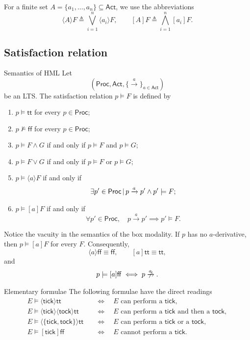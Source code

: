 \documentclass[a4paper]{article}
\newcommand{\Proc}{\mathsf{Proc}}
\newcommand{\Act}{\mathsf{Act}}
\newcommand{\ttt}{\mathsf{tt}}
\newcommand{\fff}{\mathsf{ff}}
\newcommand{\trans}[1]{\xrightarrow{#1}}
\newcommand{\nottrans}[1]{\centernot{\xrightarrow{#1}}}
\begin{document}
For a finite set \(A=\{a_1,\ldots,a_n\}\subseteq\Act\), we use the abbreviations
\[
    \langle A\rangle F
    \triangleq
    \bigvee_{i=1}^n \langle a_i\rangle F,
    \qquad
    [A]F
    \triangleq
    \bigwedge_{i=1}^n [a_i]F.
\]

\subsection{Satisfaction relation}

\begin{snippetdefinition}{Semantics of HML}
    Let
    \[
        (\Proc,\Act,\{\trans{a}\}_{a\in\Act})
    \]
    be an LTS. The satisfaction relation \(p\models F\) is defined by
    \begin{enumerate}
        \item \(p\models\ttt\) for every \(p\in\Proc\);
        \item \(p\not\models\fff\) for every \(p\in\Proc\);
        \item \(p\models F\land G\) if and only if \(p\models F\) and \(p\models G\);
        \item \(p\models F\lor G\) if and only if \(p\models F\) or \(p\models G\);
        \item \(p\models\langle a\rangle F\) if and only if
            \[
                \exists p'\in\Proc\suchthat
                p\trans{a}p'\land p'\models F;
            \]
        \item \(p\models[a]F\) if and only if
            \[
                \forall p'\in\Proc,
                \quad p\trans{a}p'\implies p'\models F.
            \]
    \end{enumerate}
\end{snippetdefinition}

Notice the vacuity in the semantics of the box modality.
If \(p\) has no \(a\)-derivative, then \(p\models[a]F\) for every \(F\).
Consequently,
\[
    \langle a\rangle\fff \equiv \fff,
    \qquad
    [a]\ttt \equiv \ttt,
\]
and
\[
    p\models[a]\fff
    \iff
    p\nottrans{a}.
\]

\begin{snippetexample}{Elementary formulae}
    The following formulae have the direct readings
    \begin{align*}
        E\models\langle\mathsf{tick}\rangle\ttt
        &\quad\Longleftrightarrow\quad
        E \text{ can perform a }\mathsf{tick},\\
        E\models\langle\mathsf{tick}\rangle\langle\mathsf{tock}\rangle\ttt
        &\quad\Longleftrightarrow\quad
        E \text{ can perform a }\mathsf{tick}\text{ and then a }\mathsf{tock},\\
        E\models\langle\{\mathsf{tick},\mathsf{tock}\}\rangle\ttt
        &\quad\Longleftrightarrow\quad
        E \text{ can perform a }\mathsf{tick}\text{ or a }\mathsf{tock},\\
        E\models[\mathsf{tick}]\fff
        &\quad\Longleftrightarrow\quad
        E \text{ cannot perform a }\mathsf{tick}.
    \end{align*}
\end{snippetexample}
\end{document}
